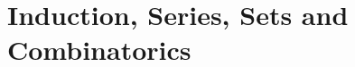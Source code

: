 \documentclass{scrreprt}
\begin{document}
\setlength{\parindent}{0pt}
\setlength{\parskip}{8pt}

\chapter{Induction, Series, Sets and Combinatorics} %
\end{document}
